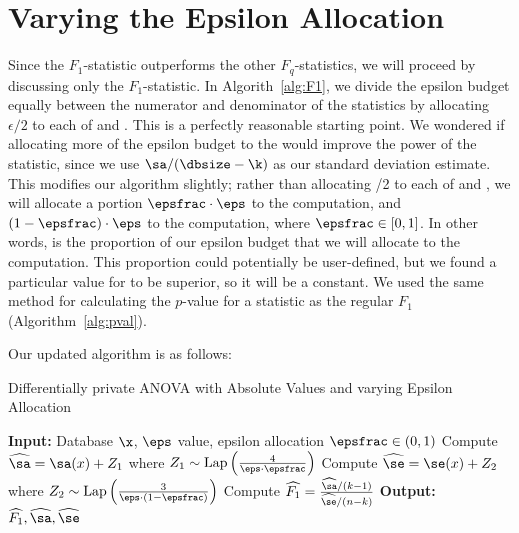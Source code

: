 \section{Varying the Epsilon Allocation}
Since the $F_1$-statistic outperforms the other $F_q$-statistics, we will proceed by discussing only the $F_1$-statistic. In Algorith~\ref{alg:F1}, we divide the epsilon budget equally between the numerator and denominator of the statistics by allocating $\epsilon/2$ to each of \sa and \se. This is a perfectly reasonable starting point. We wondered if allocating more of the epsilon budget to the \sa would improve the power of the statistic, since we use $\sa/(\dbsize - \k)$ as our standard deviation estimate. This modifies our algorithm slightly; rather than allocating \eps/2 to each of \sa and \se, we will allocate a portion $\epsfrac \cdot \eps$ to the \sa  computation, and $(1-\epsfrac)\cdot \eps$ to the \se computation, where $\epsfrac \in [0,1]$.  In other words, \epsfrac is the proportion of our epsilon budget that we will allocate to the \sa computation. This proportion could potentially be user-defined, but we found a particular value for \epsfrac to be superior, so it will be a constant. We used the same method for calculating the $p$-value for a statistic as the regular $F_1$ (Algorithm~\ref{alg:pval}).

Our updated algorithm is as follows: 
\begin{algorithm}
    \caption{Differentially private ANOVA with Absolute Values and varying Epsilon Allocation \label{alg:F1epsfrac}}
    \begin{algorithmic}
        \STATE \textbf{Input:} Database $\x$, $\eps$ value, epsilon allocation $\epsfrac \in (0,1)$
        \STATE Compute $\widehat{\sa} = \sa(x) + Z_1$ where $Z_1\sim\text{Lap}\left(\frac{4}{\eps\cdot\epsfrac}\right)$
        \STATE Compute $\widehat{\se} = \se(x) + Z_2$ where $Z_2\sim\text{Lap}\left(\frac{3}{\eps\cdot(1-\epsfrac)}\right)$
        \STATE Compute $\widehat{F_1} = \frac{\widehat{\sa}/(k-1)}{\widehat{\se}/(n-k)}$
        \STATE \textbf{Output:} $\widehat{F_1}, \widehat{\sa}, \widehat{\se}$
    \end{algorithmic}
\end{algorithm}

